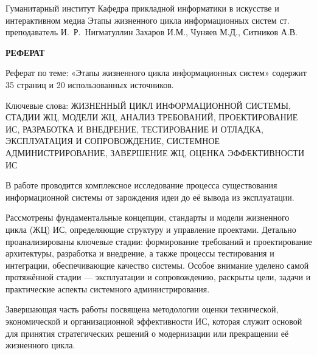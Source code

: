 \documentclass{SibFU-docs}
\begin{document}
\renewcommand{\contentsname}{}
\mycovertitle
{Гуманитарный институт}
{Кафедра прикладной информатики в искусстве и интерактивном медиа}
{Этапы жизненного цикла информационных систем}
{ст. преподаватель И.~Р.~Нигматуллин}
{Захаров И.М., Чуняев М.Д., Ситников А.В.}
 
\begin{center}
\bfseries РЕФЕРАТ
\end{center}
\noindent

Реферат по теме: «Этапы жизненного цикла информационных систем» содержит 35 страниц и 20 использованных источников.

Ключевые слова: ЖИЗНЕННЫЙ ЦИКЛ ИНФОРМАЦИОННОЙ СИСТЕМЫ, СТАДИИ ЖЦ, МОДЕЛИ ЖЦ, АНАЛИЗ ТРЕБОВАНИЙ, ПРОЕКТИРОВАНИЕ ИС, РАЗРАБОТКА И ВНЕДРЕНИЕ, ТЕСТИРОВАНИЕ И ОТЛАДКА, ЭКСПЛУАТАЦИЯ И СОПРОВОЖДЕНИЕ, СИСТЕМНОЕ АДМИНИСТРИРОВАНИЕ, ЗАВЕРШЕНИЕ ЖЦ, ОЦЕНКА ЭФФЕКТИВНОСТИ ИС

В работе проводится комплексное исследование процесса существования информационной системы от зарождения идеи до её вывода из эксплуатации.

Рассмотрены фундаментальные концепции, стандарты и модели жизненного цикла (ЖЦ) ИС, определяющие структуру и управление проектами. Детально проанализированы ключевые стадии: формирование требований и проектирование архитектуры, разработка и внедрение, а также процессы тестирования и интеграции, обеспечивающие качество системы. Особое внимание уделено самой протяжённой стадии — эксплуатации и сопровождению, раскрыты цели, задачи и практические аспекты системного администрирования. 

Завершающая часть работы посвящена методологии оценки технической, экономической и организационной эффективности ИС, которая служит основой для принятия стратегических решений о модернизации или прекращении её жизненного цикла.
\end{document}
